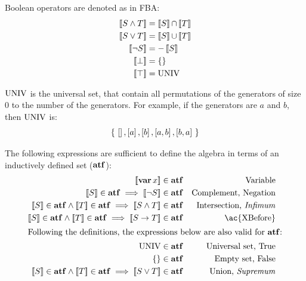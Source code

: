 \documentclass[12pt,openright,twoside,a4paper,oldfontcommands,english,brazil,final]{abntex2}
\theoremstyle{theo}
\def\varop{\ensuremath\operatorname{\mathbf{var}}}
\newcommand{\var}[1]{\ensuremath\varop #1}
\def\xbeforeop{\ensuremath\rightarrow}
\newcommand{\xbefore}[2]{\ensuremath #1 \xbeforeop #2 }
\def\True{\ensuremath\operatorname{UNIV}}
\def\False{\ensuremath\operatorname{\left\{\right\}}}
\def\algebraset{\ensuremath\mathbf{atf}}
\newcommand{\listsin}[1]{\ensuremath\left[ #1 \right]}
\def\union{\ensuremath\operatorname{\cup}}
\def\inter{\ensuremath\operatorname{\cap}}
\newcommand{\denote}[1]{\ensuremath\left[\!\left[#1\right]\!\right]}
\begin{document}
Boolean operators are denoted as in \ac{FBA}:
\begin{subequations}
\begin{align}
\denote{S \land T} & = \denote{S} \inter \denote{T}\label{eq:denotational-inf}\\
\denote{S \lor T} & = \denote{S} \union \denote{T}\label{eq:denotational-sup}\\
\denote{\lnot S} & = - \denote{S} \label{eq:denotational-complement}\\
\denote{\bot} &= \False\label{eq:denotational-bot}\\
\denote{\top} &= \True\label{eq:denotational-top}
\end{align}
\end{subequations}

$\True$ is the universal set, that contain all permutations of the generators of size $0$ to the number of the generators.
For example, if the generators are $a$ and $b$, then $\True$ is:
%
\[
\left\{~ \listsin{}, \listsin{a}, \listsin{b}, \listsin{a,b}, \listsin{b,a} ~\right\}
\]


The following expressions are sufficient to define the \ac{algebra} in terms of an inductively defined set ($\algebraset$):
%
\begin{subequations}
\label{def:algebraset}
\begin{align}
\denote{\var x} & \in \algebraset & \text{Variable}\label{def:algebraset-var}\\
\denote{S} \in \algebraset \implies \denote{\lnot S} & \in \algebraset & \text{Complement, Negation}\label{def:algebraset-compl}\\
\denote{S} \in \algebraset \land \denote{T} \in \algebraset \implies \denote{S \land T} & \in \algebraset & \text{Intersection, \emph{Infimum}}\label{def:algebraset-inf}\\
\denote{S} \in \algebraset \land \denote{T} \in \algebraset \implies \denote{\xbefore{S}{T}} & \in \algebraset & \text{\ac{XBefore}}\label{def:algebraset-xbefore}\\
\intertext{Following the definitions, the expressions below are also valid for $\algebraset$:}
\True &\in \algebraset & \text{Universal set, True}\label{def:algebraset-true}\\
\False &\in \algebraset & \text{Empty set, False}\label{def:algebraset-false}\\
\denote{S} \in \algebraset \land \denote{T} \in \algebraset \implies \denote{S \lor T} &\in \algebraset & \text{Union, \emph{Supremum}}\label{def:algebraset-sup}
\end{align}
\end{subequations}
\end{document}
